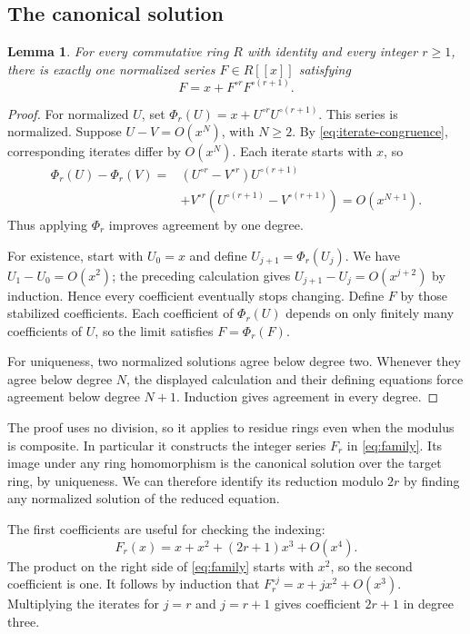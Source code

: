 \documentclass[11pt,a4paper]{article}
\newtheorem{lemma}[theorem]{Lemma}
\theoremstyle{remark}
\begin{document}
\subsection{The canonical solution}

\begin{lemma}\label{lem:unique}
For every commutative ring $R$ with identity and every integer $r\ge1$,
there is exactly one normalized series $F\in R[[x]]$ satisfying
\[
F=x+F^{\circ r}F^{\circ(r+1)}.
\]
\end{lemma}

\begin{proof}
For normalized $U$, set
$\Phi_r(U)=x+U^{\circ r}U^{\circ(r+1)}$.
This series is normalized. Suppose $U-V=O(x^N)$, with $N\ge2$.
By \eqref{eq:iterate-congruence}, corresponding iterates differ by
$O(x^N)$. Each iterate starts with $x$, so
\begin{align*}
\Phi_r(U)-\Phi_r(V)
={}&(U^{\circ r}-V^{\circ r})U^{\circ(r+1)}\\
&+V^{\circ r}(U^{\circ(r+1)}-V^{\circ(r+1)})
=O(x^{N+1}).
\end{align*}
Thus applying $\Phi_r$ improves agreement by one degree.

For existence, start with $U_0=x$ and define
$U_{j+1}=\Phi_r(U_j)$. We have $U_1-U_0=O(x^2)$; the preceding
calculation gives $U_{j+1}-U_j=O(x^{j+2})$ by induction. Hence every
coefficient eventually stops changing. Define $F$ by those stabilized
coefficients. Each coefficient of $\Phi_r(U)$ depends on only finitely
many coefficients of $U$, so the limit satisfies $F=\Phi_r(F)$.

For uniqueness, two normalized solutions agree below degree two.
Whenever they agree below degree $N$, the displayed calculation and
their defining equations force agreement below degree $N+1$.
Induction gives agreement in every degree.
\end{proof}

The proof uses no division, so it applies to residue rings even when
the modulus is composite. In particular it constructs the integer
series $F_r$ in \eqref{eq:family}. Its image under any ring
homomorphism is the canonical solution over the target ring, by
uniqueness. We can therefore identify its reduction modulo $2r$ by
finding any normalized solution of the reduced equation.

The first coefficients are useful for checking the indexing:
\begin{equation}\label{eq:firstcoeff}
F_r(x)=x+x^2+(2r+1)x^3+O(x^4).
\end{equation}
The product on the right side of \eqref{eq:family} starts with $x^2$,
so the second coefficient is one. It follows by induction that
$F_r^{\circ j}=x+jx^2+O(x^3)$. Multiplying the iterates for $j=r$
and $j=r+1$ gives coefficient $2r+1$ in degree three.
\end{document}
